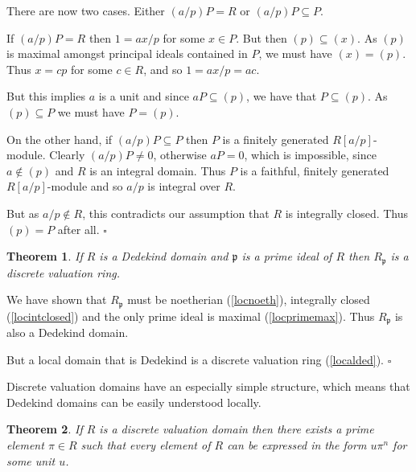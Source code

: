 \documentclass[10pt]{article}
\newcommand{\qed}{\square}
\newtheorem{theorem}{Theorem}[section]
\newenvironment{proof}[1][Proof]{\begin{trivlist}
\item[\hskip \labelsep {\bfseries #1}]}{\end{trivlist}}
\begin{document}
\begin{proof}
There are now two cases. Either $(a/p)P = R$ or $(a/p)P \subseteq P$.

If $(a/p)P = R$ then $1 = ax/p$ for some $x \in P$. But then $(p) \subseteq (x)$. As $(p)$ is maximal amongst principal ideals contained in $P$, we must have $(x) = (p)$. Thus $x = cp$ for some $c \in R$, and so $1 = ax/p = ac$.

But this implies $a$ is a unit and since $aP \subseteq (p)$, we have that $P \subseteq (p)$. As $(p) \subseteq P$ we must have $P = (p)$.

On the other hand, if $(a/p)P \subseteq P$ then $P$ is a finitely generated $R[a/p]$-module. Clearly $(a/p)P \neq 0$, otherwise $aP = 0$, which is impossible, since $a \notin (p)$ and $R$ is an integral domain. Thus $P$ is a faithful, finitely generated $R[a/p]$-module and so $a/p$ is integral over $R$.

But as $a/p \notin R$, this contradicts our assumption that $R$ is integrally closed. Thus $(p) = P$ after all. $\qed$
\end{proof}



\begin{theorem}
If $R$ is a Dedekind domain and $\mathfrak{p}$ is a prime ideal of $R$ then $R_{\mathfrak{p}}$ is a discrete valuation ring.
\end{theorem}

\begin{proof}
We have shown that $R_{\mathfrak{p}}$ must be noetherian (\ref{locnoeth}), integrally closed (\ref{locintclosed}) and the only prime ideal is maximal (\ref{locprimemax}). Thus $R_{\mathfrak{p}}$ is also a Dedekind domain.

But a local domain that is Dedekind is a discrete valuation ring (\ref{localded}). $\qed$
\end{proof}

Discrete valuation domains have an especially simple structure, which means that Dedekind domains can be easily understood locally.

\begin{theorem}
If $R$ is a discrete valuation domain then there exists a prime element $\pi \in R$ such that every element of $R$ can be expressed in the form $u\pi^n$ for some unit $u$.
\end{theorem}
\end{document}
